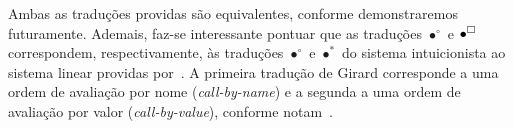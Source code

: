     Ambas as traduções providas são equivalentes, conforme demonstraremos futuramente.
    Ademais, faz-se interessante pontuar que as traduções $\bullet^\circ$ e $\bullet^\Box$ correspondem, respectivamente, às traduções $\bullet^\circ$ e $\bullet^*$ do sistema intuicionista ao sistema linear providas por~\cite{Girard}. A primeira tradução de Girard corresponde a uma ordem de avaliação por nome (\textit{call-by-name}) e a segunda a uma ordem de avaliação por valor (\textit{call-by-value}), conforme notam~\cite{Maraist}.
